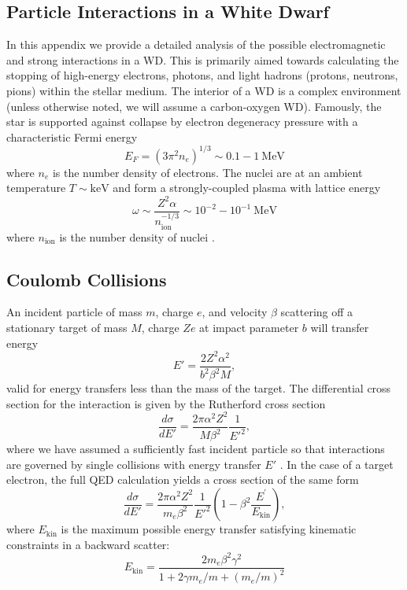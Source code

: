 \documentclass[twocolumn,showpacs,preprintnumbers,amsmath,amssymb,prd]{revtex4}
\def\r{\right)}
\def\l{\left(}
\begin{document}
\begin{appendices}

\section{Particle Interactions in a White Dwarf}
\label{sec:appendix}
In this appendix we provide a detailed analysis of the possible electromagnetic and strong interactions in a WD.
This is primarily aimed towards calculating the stopping of high-energy electrons, photons, and light hadrons (protons, neutrons, pions) within the stellar medium.
The interior of a WD is a complex environment (unless otherwise noted, we will assume a carbon-oxygen WD).
Famously, the star is supported against collapse by electron degeneracy pressure with a characteristic Fermi energy
\begin{equation}
E_F = (3 \pi^2 n_e)^{1/3} \sim 0.1 - 1 ~\text{MeV}
\end{equation}
where $n_e$ is the number density of electrons.
The nuclei are at an ambient temperature $T \sim \text{keV}$ and form a strongly-coupled plasma with lattice energy
\begin{equation}
\label{eq:lattice}
\omega \sim \frac{Z^2 \alpha}{n_\text{ion}^{-1/3}} \sim 10^{-2} - 10^{-1} ~\text{MeV}
\end{equation}
where $n_\text{ion}$ is the number density of nuclei \cite{Teukolsky}.


\subsection*{Coulomb Collisions}

An incident particle of mass $m$, charge $e$, and velocity $\beta$ scattering off a stationary target of mass $M$, charge $Ze$ at impact parameter $b$ will transfer energy
\begin{equation}
\label{eq:impact}
E' = \frac{2 Z^2 \alpha^2}{b^2 \beta ^2 M},
\end{equation}
valid for energy transfers less than the mass of the target. 
The differential cross section for the interaction is given by the Rutherford cross section
\begin{equation}
\label{eq:rutherford}
\frac{d \sigma}{dE'} = \frac{2 \pi  \alpha^2 Z^2}{M \beta^2} \frac{1}{E'^2},
\end{equation}
where we have assumed a sufficiently fast incident particle so that interactions are governed by single collisions with energy transfer $E'$ \cite{Agashe:2014kda}.
In the case of a target electron, the full QED calculation yields a cross section of the same form
\begin{equation}
\frac{d \sigma}{dE'} = \frac{2 \pi  \alpha^2 Z^2}{m_e \beta^2} \frac{1}{E'^2} \l1-\beta^2 \frac{E^\prime}{E_\text{kin}} \r,
\end{equation}
where $E_\text{kin}$ is the maximum possible energy transfer satisfying kinematic constraints in a backward scatter:
\begin{equation}
\label{eq:Ekin}
E_{\text{kin}} = \frac{2 m_e \beta^2 \gamma^2}{1+ 2\gamma m_e/m +(m_e/m)^2}
\end{equation}


\end{appendices}
\end{document}
